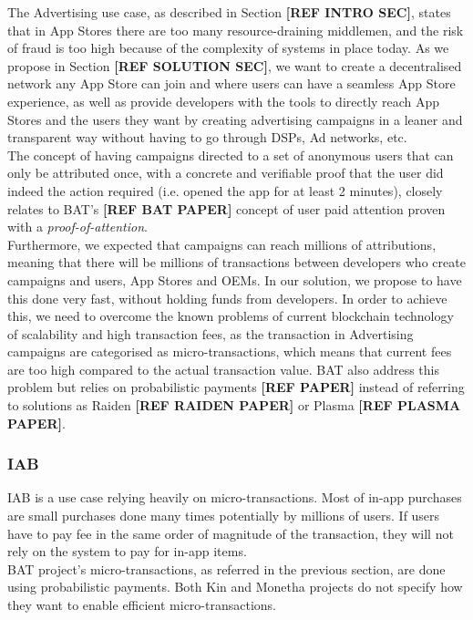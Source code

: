 The Advertising use case, as described in Section \textbf{[REF INTRO SEC]}, states that in App Stores there are too many resource-draining middlemen, and the risk of fraud is too high because of the complexity of systems in place today. As we propose in Section \textbf{[REF SOLUTION SEC]}, we want to create a decentralised network any App Store can join and where users can have a seamless App Store experience, as well as provide developers with the tools to directly reach App Stores and the users they want by creating advertising campaigns in a leaner and transparent way without having to go through DSPs, Ad networks, etc. \\

The concept of having campaigns directed to a set of anonymous users that can only be attributed once, with a concrete and verifiable proof that the user did indeed the action required (i.e. opened the app for at least 2 minutes), closely relates to BAT's \textbf{[REF BAT PAPER]} concept of user paid attention proven with a \textit{proof-of-attention}. \\

Furthermore, we expected that campaigns can reach millions of attributions, meaning that there will be millions of transactions between developers who create campaigns and users, App Stores and OEMs. In our solution, we propose to have this done very fast, without holding funds from developers. In order to achieve this, we need to overcome the known problems of current blockchain technology of scalability and high transaction fees, as the transaction in Advertising campaigns are categorised as micro-transactions, which means that current fees are too high compared to the actual transaction value. BAT also address this problem but relies on probabilistic payments \textbf{[REF PAPER]} instead of referring to solutions as Raiden \textbf{[REF RAIDEN PAPER]} or Plasma \textbf{[REF PLASMA PAPER]}.

\subsubsection{IAB}

IAB is a use case relying heavily on micro-transactions. Most of in-app purchases are small purchases done many times potentially by millions of users. If users have to pay fee in the same order of magnitude of the transaction, they will not rely on the system to pay for in-app items.\\

BAT project's micro-transactions, as referred in the previous section, are done using probabilistic payments. Both Kin and Monetha projects do not specify how they want to enable efficient micro-transactions. \\

